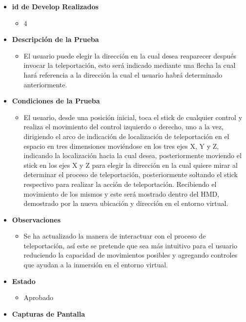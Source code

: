 \begin{itemize}
    \item \textbf{id de Develop Realizados}
    \begin{itemize}
        \item 4
    \end{itemize}
    \item \textbf{Descripción de la Prueba}
    \begin{itemize}
        \item El usuario puede elegir la dirección en la cual desea reaparecer después invocar la teleportación, esto será indicado mediante una flecha la cual hará referencia a la dirección  la cual el usuario habrá determinado anteriormente.
    \end{itemize}
    \item \textbf{Condiciones de la Prueba}
    \begin{itemize}
        \item El usuario, desde una posición inicial, toca el stick de cualquier control y realiza el movimiento del control izquierdo o derecho, uno a la vez, dirigiendo el arco de indicación de localización de teleportación en el espacio en tres dimensiones moviéndose en los tres ejes X, Y y Z, indicando la localización hacia la cual desea, posteriormente moviendo el stick en los ejes X y Z para elegir la dirección en la cual quiere mirar al determinar el proceso de teleportación,  posteriormente soltando el stick respectivo para realizar la acción de teleportación. Recibiendo el movimiento de los mismos y este será mostrado dentro del HMD, demostrado por la nueva ubicación y dirección en el entorno virtual.        
    \end{itemize}
    \item \textbf{Observaciones}
    \begin{itemize}
        \item Se ha actualizado la manera de interactuar con el proceso de teleportación, así este se pretende que sea más intuitivo para el usuario reduciendo la capacidad de movimientos posibles y agregando controles que ayudan a la inmersión en el entorno virtual.
    \end{itemize}
    \item \textbf{Estado}
    \begin{itemize}
        \item Aprobado
    \end{itemize}
    \item \textbf{Capturas de Pantalla}
    \begin{figure}[H]

\end{figure}
\end{itemize}
